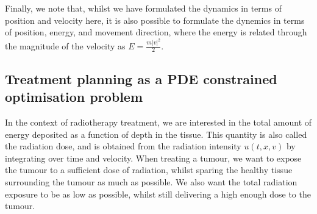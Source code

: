 Finally, we note that, whilst we have formulated the dynamics in terms of position and velocity here, it is also possible to formulate the dynemics in terms of position, energy, and movement direction, where the energy is related through the magnitude of the velocity as $E = \frac{m\lvert v \rvert^2}{2}$.


\subsection{Treatment planning as a PDE constrained optimisation problem}














In the context of radiotherapy treatment, we are interested in the total amount of energy deposited as a function of depth in the tissue. This quantity is also called the radiation dose, and is obtained from the radiation intensity $u(t,x,v)$ by integrating over time and velocity. When treating a tumour, we want to expose the tumour to a sufficient dose of radiation, whilst sparing the healthy tissue surrounding the tumour as much as possible. We also want the total radiation exposure to be as low as possible, whilst still delivering a high enough dose to the tumour. 

